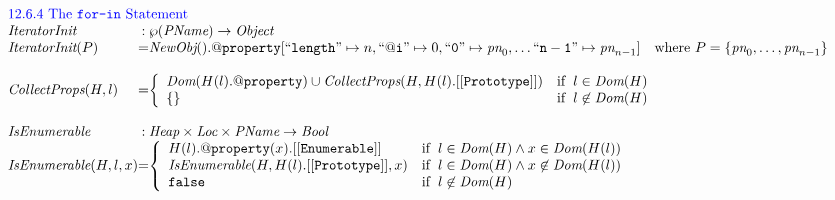 \documentclass[a4paper, leqno]{amsart}
\def\inblue{\color{blue}}
\newcommand{\nullL}{{\tt \#Null}}
\newcommand{\false}{{\tt false}}
\newcommand{\Bool}{\emph{Bool}}
\newcommand{\pname}{\emph{PName}}
\newcommand{\Loc}{\emph{Loc}}
\newcommand{\Obj}{\emph{Object}}
\newcommand{\Heap}{\emph{Heap}}
\newcommand{\hf}[1]{\emph{#1}}
\newcommand{\ifc}[1]{{\rm if}\begin{array}[t]{l}#1\end{array}}
\def\inblue{\color{blue}}
\begin{document}
\[\begin{array}{l@{}c@{}l}
\multicolumn{3}{l}{\mbox{\inblue 12.6.4 The {\tt for-in} Statement}}\\
\hf{IteratorInit} & :& \wp(\pname) \rightarrow \Obj \\
\hf{IteratorInit}(P) &=&
\hf{NewObj}().{\tt@property}[
{\tt``length"} \mapsto n,%
{\tt``@i"} \mapsto0,%
{\tt``0"} \mapsto\emph{pn}_0,%
\ldots
{\tt``n-1"} \mapsto\emph{pn}_{n-1}]%
\quad
\mbox{where}\
P = \{\emph{pn}_0, \ldots, \emph{pn}_{n-1}\}
\\\\

%
 \hf{CollectProps}(H, l) &=&
 \left\{ \begin{array}{ll}
 \hf{Dom}(H(l).{\tt @property}) \cup \hf{CollectProps}(H, H(l).{\tt [[Prototype]]})
&\ifc{l \in\hf{Dom}(H)}\\
\{\} &\ifc{l \not\in \hf{Dom}(H)}
 \end{array}
 \right.
 \\\\


\hf{IsEnumerable} & :& \Heap \times \Loc \times \pname \rightarrow \Bool \\
\hf{IsEnumerable}(H, l, x) &=&
\left\{ \begin{array}{ll}
H(l).{\tt @property}(x).{\tt[[Enumerable]]}
&\ifc{l \in\hf{Dom}(H) \wedge x\in\hf{Dom}(H(l))}\\
\hf{IsEnumerable}(H, H(l).{\tt [[Prototype]]}, x)
&\ifc{l \in\hf{Dom}(H) \wedge x\not\in\hf{Dom}(H(l))}\\
\false &\ifc{l \not\in\hf{Dom}(H)}\\
\end{array}
\right.
\\\\


\end{array}\]
\end{document}
